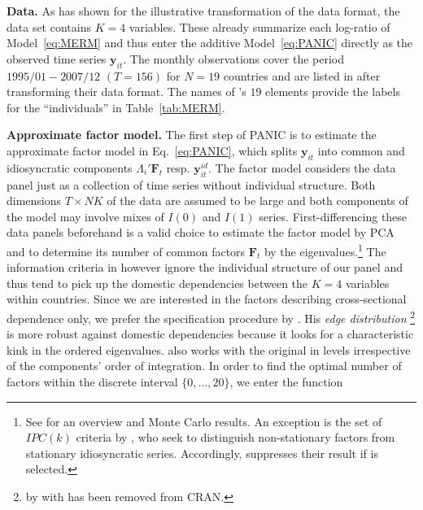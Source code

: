 \textbf{Data.} As  has shown for the illustrative transformation of the data format, the data set  contains $ K=4 $ variables. These already summarize each log-ratio of Model~\eqref{eq:MERM} and thus enter the additive Model~\eqref{eq:PANIC} directly as the observed time series $ \boldsymbol{y}_{it} $. The  monthly observations cover the period $ 1995/01 - 2007/12 $ $ (T = 156) $ for $ N = 19 $ countries and are listed in  after transforming their data format. The names of 's $ 19 $ elements provide the labels for the ``individuals'' in Table~\ref{tab:MERM}.


\textbf{Approximate factor model.} The first step of PANIC is to estimate the approximate factor model in Eq.~\eqref{eq:PANIC}, which splits $ \boldsymbol{y}_{it} $ into common and idiosyncratic components $ \Lambda_i' \boldsymbol{F}_t $ resp. $ \boldsymbol{y}^{i \! d}_{it} $. The factor model considers the data panel just as a collection of time series without individual structure. Both dimensions $ T \times NK $ of the data are assumed to be large and both components of the model may involve mixes of $  I(0) $ and $ I(1) $ series. First-differencing these data panels beforehand is a valid choice to estimate the factor model by PCA \citep{BaiNg2004} and to determine its number of common factors $ \boldsymbol{F}_t $ by the eigenvalues.\footnote{See \cite{CoronaEtAl2017} for an overview and Monte Carlo results. An exception is the set of $ IPC(k) $ criteria by \citet{Bai2004}, who seek to distinguish non-stationary factors from stationary idiosyncratic series. Accordingly,  suppresses their result if  is selected.} The information criteria in \code{[[1]]} however ignore the individual structure of our panel and thus tend to pick up the domestic dependencies between the $ K=4 $ variables within countries. Since we are interested in the factors describing cross-sectional dependence only, we prefer the specification procedure by \cite{Onatski2010}. His \textit{edge distribution} \footnote{ by \citet{BadaLiebl2014} with  has been removed from CRAN.} is more robust against domestic dependencies because it looks for a characteristic kink in the ordered eigenvalues.  also works with the original  in levels irrespective of the components' order of integration. In order to find the optimal number of factors within the discrete interval $ \lbrace 0,\ldots,20 \rbrace $, we enter the  function 
